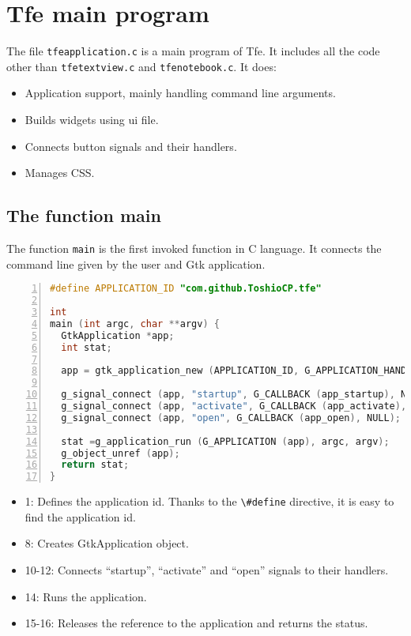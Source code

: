 \section{Tfe main program}\label{tfe-main-program}

The file \passthrough{\lstinline!tfeapplication.c!} is a main program of
Tfe. It includes all the code other than
\passthrough{\lstinline!tfetextview.c!} and
\passthrough{\lstinline!tfenotebook.c!}. It does:

\begin{itemize}
\tightlist
\item
  Application support, mainly handling command line arguments.
\item
  Builds widgets using ui file.
\item
  Connects button signals and their handlers.
\item
  Manages CSS.
\end{itemize}

\subsection{The function main}\label{the-function-main}

The function \passthrough{\lstinline!main!} is the first invoked
function in C language. It connects the command line given by the user
and Gtk application.

\begin{lstlisting}[language=C, numbers=left]
#define APPLICATION_ID "com.github.ToshioCP.tfe"

int
main (int argc, char **argv) {
  GtkApplication *app;
  int stat;

  app = gtk_application_new (APPLICATION_ID, G_APPLICATION_HANDLES_OPEN);

  g_signal_connect (app, "startup", G_CALLBACK (app_startup), NULL);
  g_signal_connect (app, "activate", G_CALLBACK (app_activate), NULL);
  g_signal_connect (app, "open", G_CALLBACK (app_open), NULL);

  stat =g_application_run (G_APPLICATION (app), argc, argv);
  g_object_unref (app);
  return stat;
}
\end{lstlisting}

\begin{itemize}
\tightlist
\item
  1: Defines the application id. Thanks to the
  \passthrough{\lstinline!\#define!} directive, it is easy to find the
  application id.
\item
  8: Creates GtkApplication object.
\item
  10-12: Connects ``startup'', ``activate'' and ``open'' signals to
  their handlers.
\item
  14: Runs the application.
\item
  15-16: Releases the reference to the application and returns the
  status.
\end{itemize}

